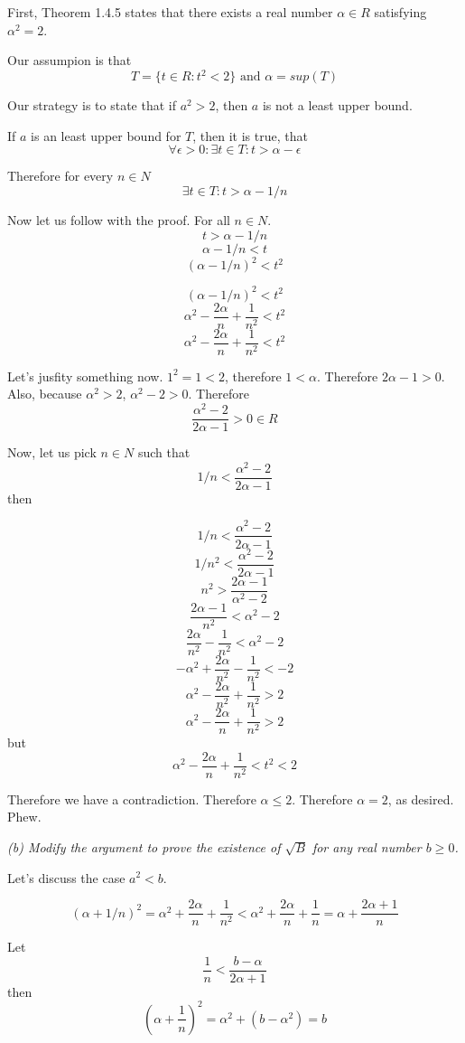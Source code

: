 \documentclass[11pt,oneside,titlepage]{book}
\begin{document}
First, Theorem 1.4.5 states that there exists a real number $\alpha \in R$
satisfying $\alpha ^ 2 = 2$.

Our assumpion is that
$$T = \{t \in R: t ^ 2 < 2\}\text{ and }\alpha = sup(T)$$

Our strategy is to state that if $a^2 > 2$, then $a$ is not a least upper
bound.

If $a$ is an least upper bound for $T$, then it is true, that
$$\forall \epsilon > 0: \exists t \in T: t > \alpha - \epsilon $$

Therefore for every $n \in N$
$$\exists t \in T: t > \alpha - 1/n $$

Now let us follow with the proof. For all $n \in N$.
$$t > \alpha - 1/n $$
$$\alpha - 1/n < t $$
$$(\alpha - 1/n)^2 < t^2 $$

$$(\alpha - 1/n)^2 < t^2 $$
$$\alpha^2 - \frac{2 \alpha}{n} + \frac{1}{n^2} < t^2 $$
$$\alpha^2 - \frac{2 \alpha}{n} + \frac{1}{n^2} < t^2 $$

Let's jusfity something now. $1^2 = 1 < 2$, therefore $1 < \alpha$. Therefore
$2 \alpha - 1 > 0$. Also, because $\alpha^2 > 2$, $\alpha^2 - 2 > 0$.
Therefore 
$$\frac{\alpha^2 - 2}{2 \alpha -  1} > 0 \in R$$

Now, let us pick $n \in N$ such that
$$1/n < \frac{\alpha^2 - 2}{2 \alpha -  1}$$
then

$$1/n < \frac{\alpha^2 - 2}{2 \alpha -  1}$$
$$1/n^2 < \frac{\alpha^2 - 2}{2 \alpha -  1}$$
$$n^2 > \frac{2 \alpha -  1}{\alpha^2 - 2}$$
$$\frac{2 \alpha -  1}{n^2} < \alpha^2 - 2$$
$$\frac{2 \alpha}{n^2} -  \frac{1}{n^2} < \alpha^2 - 2$$
$$- \alpha^2 + \frac{2 \alpha}{n^2} -  \frac{1}{n^2} < - 2$$
$$\alpha^2 - \frac{2 \alpha}{n^2} +  \frac{1}{n^2} > 2$$
$$\alpha^2 - \frac{2 \alpha}{n} +  \frac{1}{n^2} > 2$$
but
$$\alpha^2 - \frac{2 \alpha}{n} + \frac{1}{n^2} < t^2 < 2 $$

Therefore we have a contradiction. Therefore $\alpha \leq 2$. Therefore
$\alpha = 2$, as desired. Phew.

\textit{(b) Modify the argument to prove the existence of $\sqrt{B}$ for any
  real number $b \geq 0$.}

Let's discuss the case  $a^2 < b$.

$$(\alpha + 1/n)^2 = \alpha^2 + \frac{2 \alpha}{n} + \frac{1}{n^2} <
\alpha ^2 + \frac{2 \alpha}{n} + \frac{1}{n} = \alpha + \frac{2 \alpha + 1}{n}
$$

Let 
$$\frac{1}{n} < \frac{b - \alpha}{2 \alpha + 1}$$
then 
$$(\alpha + \frac{1}{n})^2 = \alpha^2 + (b - \alpha^2) = b$$
\end{document}

